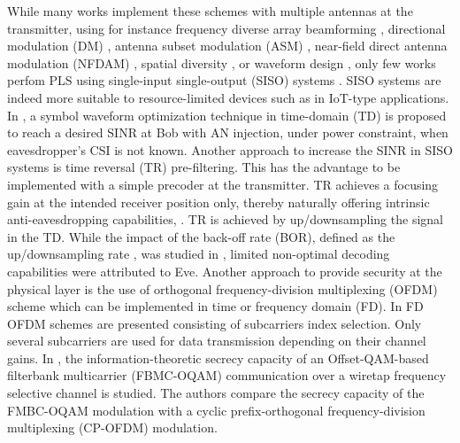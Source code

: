 \documentclass[journal,comsoc]{IEEEtran}
\begin{document}
While many works implement these schemes with multiple antennas at the transmitter, using for instance frequency diverse array beamforming \cite{li_qiang_2018_1159254,8078202}, directional modulation (DM) \cite{5159486},  antenna subset modulation (ASM) \cite{6544472}, near-field direct antenna modulation (NFDAM) \cite{4684619,4523120}, spatial diversity \cite{5580113,7070667,8786136,5738303}, or waveform design \cite{9062307}, only few works perfom PLS using single-input single-output (SISO) systems \cite{li2013waveform,9003692,8093595,8093591,xu2018security,li2018artificial,li2017artificial,9049811,7475864,7041552}. SISO systems are indeed more suitable to resource-limited devices such as in IoT-type applications.   In \cite{li2013waveform}, a symbol waveform optimization technique in time-domain (TD) is proposed to reach a desired SINR at Bob with AN injection, under power constraint, when eavesdropper’s CSI is not known. Another approach to increase the SINR in SISO systems is time reversal (TR) pre-filtering. This has the advantage to be implemented with a simple precoder at the transmitter. TR achieves a focusing gain at the intended receiver position only, thereby naturally offering intrinsic anti-eavesdropping capabilities, \cite{9003692,oestges2005characterization}. TR is achieved by up/downsampling the signal in the TD. While the impact of the back-off rate (BOR), defined as the up/downsampling rate \cite{dubois2010use}, was studied in \cite{9003692,9049811}, limited non-optimal decoding capabilities were attributed to Eve. Another approach to provide security at the physical layer is the use of orthogonal frequency-division multiplexing (OFDM) scheme which can be implemented in time or frequency domain (FD). In \cite{8093595,8093591} FD OFDM schemes are presented consisting of subcarriers index selection. Only several subcarriers are used for data transmission depending on their channel gains.  In \cite{9062307}, the information-theoretic secrecy capacity of an Offset-QAM-based filterbank multicarrier (FBMC-OQAM) communication over a wiretap frequency selective channel is studied. The authors compare the secrecy capacity of the FMBC-OQAM modulation with a cyclic prefix-orthogonal frequency-division multiplexing (CP-OFDM) modulation.
\end{document}

